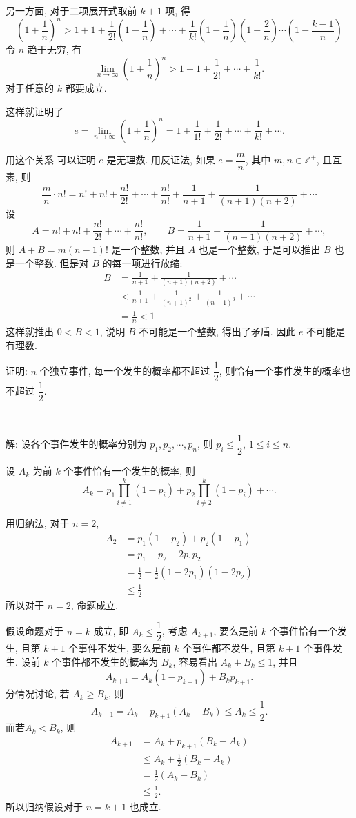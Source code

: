 另一方面, 对于二项展开式取前 $k+1$ 项, 得
\[\left(1+\frac{1}{n}\right)^n  > 1 + 1 + \frac{1}{2!}(1-\frac{1}{n}) + \cdots + \frac{1}{k!}(1-\frac{1}{n})(1-\frac{2}{n})\cdots(1-\frac{k-1}{n}) \]
令 $n$ 趋于无穷, 有
\[ \lim_{n\to\infty}\left(1+\frac{1}{n}\right)^n > 1 + 1 + \frac{1}{2!} + \cdots + \frac{1}{k!}. \]
对于任意的 $k$ 都要成立.

这样就证明了
\[e =  \lim_{n\to\infty}\left(1+\frac{1}{n}\right)^n = 1 + \frac{1}{1!} + \frac{1}{2!} + \cdots + \frac{1}{k!} + \cdots .\]

用这个关系 可以证明 $e$ 是无理数. 用反证法, 如果 $e = \dfrac{m}{n}$, 其中 $m,n\in\mathbb{Z}^+$, 且互素, 则
\[\frac{m}{n}\cdot n! = n! + n! + \frac{n!}{2!} + \cdots + \frac{n!}{n!} + \frac{1}{n+1} + \frac{1}{(n+1)(n+2)} + \cdots \]
设 
$$A = n!+n!+\dfrac{n!}{2!}+\cdots+\dfrac{n!}{n!}, \qquad B = \frac{1}{n+1} + \frac{1}{(n+1)(n+2)} + \cdots,$$ 
则 $A+B = m(n-1)!$ 是一个整数, 并且 $A$ 也是一个整数, 于是可以推出 $B$ 也是一个整数. 但是对 $B$ 的每一项进行放缩:
\begin{align*}
B &= \frac{1}{n+1} + \frac{1}{(n+1)(n+2)} + \cdots \\
& < \frac{1}{n+1} + \frac{1}{(n+1)^2} +  \frac{1}{(n+1)^3} + \cdots \\
&= \frac{1}{n} < 1
\end{align*}
这样就推出 $0 < B < 1$, 说明 $B$ 不可能是一个整数, 得出了矛盾. 因此 $e$ 不可能是有理数.

\newpage

证明: $n$ 个独立事件, 每一个发生的概率都不超过 $\dfrac{1}{2}$, 则恰有一个事件发生的概率也不超过 $\dfrac{1}{2}$.

~

解: 设各个事件发生的概率分别为 $p_1, p_2, \cdots, p_n$, 则 $p_i \le \dfrac{1}{2}$, $1\le i \le n$. 

设 $A_k$ 为前 $k$ 个事件恰有一个发生的概率, 则
\[ A_k = p_1\prod_{i\neq 1}^k(1-p_i) + p_2\prod_{i\neq 2}^k(1-p_i) + \cdots .\]

用归纳法, 对于  $n=2$, 
\begin{align*} 
A_2 &= p_1(1-p_2) + p_2(1-p_1) \\
&= p_1+p_2-2p_1p_2 \\
&= \frac{1}{2}-\frac{1}{2}(1-2p_1)(1-2p_2) \\
& \le \frac{1}{2}
\end{align*}
所以对于 $n=2$, 命题成立.

假设命题对于 $n=k$ 成立, 即 $A_k \le \dfrac{1}{2}$, 考虑 $A_{k+1}$, 要么是前 $k$ 个事件恰有一个发生, 且第 $k+1$ 个事件不发生, 要么是前 $k$ 个事件都不发生, 且第 $k+1$ 个事件发生. 设前 $k$ 个事件都不发生的概率为 $B_k$, 容易看出 $A_k + B_k \le 1$, 并且
\[A_{k+1} = A_k(1-p_{k+1}) + B_kp_{k+1} .\]
分情况讨论, 若 $A_k \ge B_k$, 则 
\[ A_{k+1} = A_k - p_{k+1}(A_k-B_k) \le A_k \le \frac{1}{2}.\]
而若$A_k < B_k$, 则
\begin{align*} 
A_{k+1} &= A_k + p_{k+1}(B_k-A_k) \\
&\le A_k + \frac{1}{2}(B_k-A_k) \\
& = \frac{1}{2}(A_k+B_k) \\
&\le \frac{1}{2} .
\end{align*}
所以归纳假设对于 $n=k+1$ 也成立.

